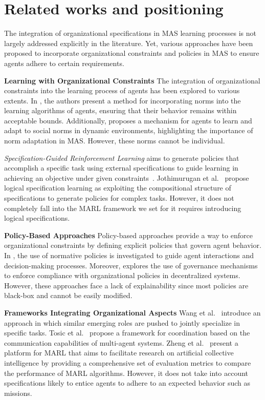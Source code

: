 \documentclass[sigconf,anonymous]{aamas}
\begin{document}
\section{Related works and positioning}\label{sec:related_works}

The integration of organizational specifications in MAS learning processes is not largely addressed explicitly in the literature. Yet, various approaches have been proposed to incorporate organizational constraints and policies in MAS to ensure agents adhere to certain requirements.

\textbf{Learning with Organizational Constraints} \quad
%
The integration of organizational constraints into the learning process of agents has been explored to various extents. In \cite{cruz2020norms}, the authors present a method for incorporating norms into the learning algorithms of agents, ensuring that their behavior remains within acceptable bounds. Additionally, \cite{villatoro2011social} proposes a mechanism for agents to learn and adapt to social norms in dynamic environments, highlighting the importance of norm adaptation in MAS. However, these norms cannot be individual.

\emph{Specification-Guided Reinforcement Learning} aims to generate policies that accomplish a specific task using external specifications to guide learning in achieving an objective under given constraints~\cite{Bansal2022}. Jothimurugan et al.~\cite{Jothimurugan2021} propose logical specification learning as exploiting the compositional structure of specifications to generate policies for complex tasks. However, it does not completely fall into the MARL framework we set for it requires introducing logical specifications.

\textbf{Policy-Based Approaches} \quad
%
Policy-based approaches provide a way to enforce organizational constraints by defining explicit policies that govern agent behavior. In \cite{krupanski2015norm}, the use of normative policies is investigated to guide agent interactions and decision-making processes. Moreover, \cite{vos2020governing} explores the use of governance mechanisms to enforce compliance with organizational policies in decentralized systems. However, these approaches face a lack of explainability since most policies are black-box and cannot be easily modified.

\textbf{Frameworks Integrating Organizational Aspects} \quad
%
Wang et al.~\cite{Wang2020} introduce an approach in which similar emerging roles are pushed to jointly specialize in specific tasks. Tosic et al.~\cite{Tosic2010} propose a framework for coordination based on the communication capabilities of multi-agent systems. Zheng et al.~\cite{Zheng2018} present a platform for MARL that aims to facilitate research on artificial collective intelligence by providing a comprehensive set of evaluation metrics to compare the performance of MARL algorithms. However, it does not take into account specifications likely to entice agents to adhere to an expected behavior such as missions.
\end{document}
